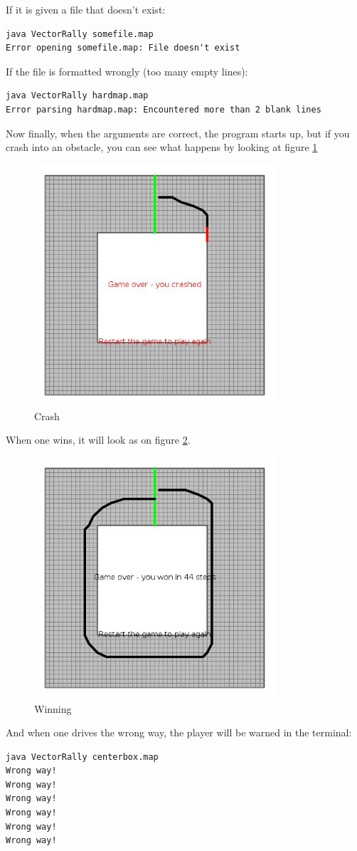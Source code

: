 If it is given a file that doesn't exist:
\begin{Verbatim}
java VectorRally somefile.map             
Error opening somefile.map: File doesn't exist
\end{Verbatim}

If the file is formatted wrongly (too many empty lines):
\begin{Verbatim}
java VectorRally hardmap.map 
Error parsing hardmap.map: Encountered more than 2 blank lines
\end{Verbatim}

Now finally, when the arguments are correct, the program starts up, but if you crash into an obstacle, you can see what happens
by looking at figure \ref{fig:crash}
\begin{figure}[p]
	\centering
	\includegraphics[width=0.8\textwidth]{crash.jpg}
	\caption{Crash}
	\label{fig:crash}
\end{figure}

When one wins, it will look as on figure \ref{fig:win}.
\begin{figure}[p]
	\centering
	\includegraphics[width=0.8\textwidth]{win.jpg}
	\caption{Winning}
	\label{fig:win}
\end{figure}

And when one drives the wrong way, the player will be warned in the terminal:
\begin{Verbatim}
java VectorRally centerbox.map 
Wrong way!
Wrong way!
Wrong way!
Wrong way!
Wrong way!
Wrong way!
\end{Verbatim}

